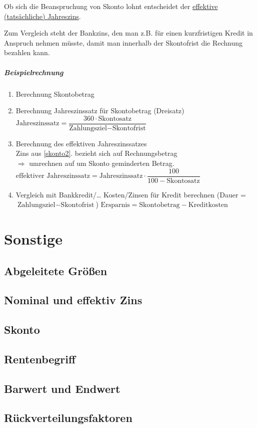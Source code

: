 Ob sich die Beanspruchung von Skonto lohnt entscheidet der \ul{effektive (tatsächliche) Jahreszins}.

Zum Vergleich steht der Bankzins, den man z.B. für einen kurzfristigen Kredit in Anspruch nehmen müsste, damit man innerhalb der Skontofrist die Rechnung bezahlen kann.



\paragraph{Beispielrechnung}
\begin{enumerate}
	\item Berechnung Skontobetrag
	\item\label{skonto2} Berechnung Jahreszinssatz für Skontobetrag (Dreisatz)\\
	$\text{Jahreszinssatz} = \dfrac{360\cdot\text{Skontosatz}}{\text{Zahlungsziel} - \text{Skontofrist}}$
	\item Berechnung des effektiven Jahreszinssatzes\\
	Zins aus \ref*{skonto2}. bezieht sich auf Rechnungsbetrag\\
	$\Rightarrow$ umrechnen auf um Skonto geminderten Betrag.\\
	$\text{effektiver Jahreszinssatz} = \text{Jahreszinssatz}\cdot\dfrac{100}{100 - \text{Skontosatz}}$
	\item Vergleich mit Bankkredit/\ldots
	\subitem Kosten/Zinsen für Kredit berechnen (Dauer = $\text{Zahlungsziel} - \text{Skontofrist}$)
	\subitem $\text{Ersparnis} = \text{Skontobetrag} - \text{Kreditkosten}$
\end{enumerate}

\clearpage
\chapter{Sonstige}
\section{Abgeleitete Größen}
\section{Nominal und effektiv Zins}
\section{Skonto}
\section{Rentenbegriff}
\section{Barwert und Endwert}
\section{Rückverteilungsfaktoren}